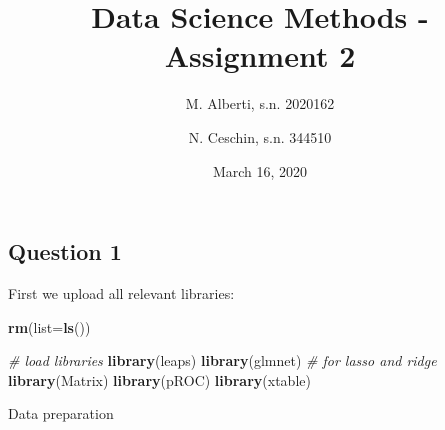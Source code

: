 \documentclass[
]{article}
\title{Data Science Methods - Assignment 2}
\author{M. Alberti, s.n. 2020162 \and N. Ceschin, s.n. 344510}
\date{March 16, 2020}
\newenvironment{Shaded}{\begin{snugshade}}{\end{snugshade}}
\newcommand{\CommentTok}[1]{\textcolor[rgb]{0.56,0.35,0.01}{\textit{#1}}}
\newcommand{\DataTypeTok}[1]{\textcolor[rgb]{0.13,0.29,0.53}{#1}}
\newcommand{\KeywordTok}[1]{\textcolor[rgb]{0.13,0.29,0.53}{\textbf{#1}}}
\newcommand{\NormalTok}[1]{#1}
\begin{document}
\maketitle

\hypertarget{question-1}{%
\subsection{Question 1}\label{question-1}}

First we upload all relevant libraries:

\begin{Shaded}
\begin{Highlighting}[]
\KeywordTok{rm}\NormalTok{(}\DataTypeTok{list=}\KeywordTok{ls}\NormalTok{())}

\CommentTok{# load libraries}
\KeywordTok{library}\NormalTok{(leaps)}
\KeywordTok{library}\NormalTok{(glmnet) }\CommentTok{# for lasso and ridge}
\KeywordTok{library}\NormalTok{(Matrix)}
\KeywordTok{library}\NormalTok{(pROC)}
\KeywordTok{library}\NormalTok{(xtable)}
\end{Highlighting}
\end{Shaded}

Data preparation
\end{document}
